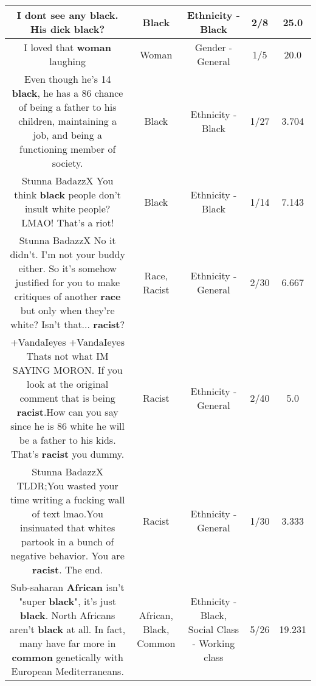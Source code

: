 \documentclass[11pt]{article}
\newlength\mylength
\begin{document}
\begin{center}
\begin{longtable}{|C{.65\mylength}|C{.30\mylength}|C{.12\mylength}|C{.12\mylength}|C{.12\mylength}|}
  \small I dont see any \textbf{black}. His dick \textbf{black}?\normalsize   & Black & Ethnicity - Black & 2/8 & 25.0 \\  \hline
  \small I loved that \textbf{woman} laughing\normalsize   & Woman & Gender - General & 1/5 & 20.0 \\  \hline
  \small Even though he's 14 \textbf{black}, he has a 86 chance of being a father to his children, maintaining a job, and being a functioning member of society.\normalsize   & Black & Ethnicity - Black & 1/27 & 3.704 \\  \hline
  \small Stunna BadazzX You think \textbf{black} people don't insult white people? LMAO! That's a riot!\normalsize   & Black & Ethnicity - Black & 1/14 & 7.143 \\  \hline
  \small Stunna BadazzX No it didn't. I'm not your buddy either. So it's somehow justified for you to make critiques of another \textbf{race} but only when they're white? Isn't that... \textbf{racist}?\normalsize   & Race, Racist & Ethnicity - General & 2/30 & 6.667 \\  \hline
  \small +VandaIeyes +VandaIeyes Thats not what IM SAYING MORON. If you look at the original comment that is being \textbf{racist}.How can you say since he is 86 white he will be a father to his kids. That's \textbf{racist} you dummy.\normalsize   & Racist & Ethnicity - General & 2/40 & 5.0 \\  \hline
  \small Stunna BadazzX TLDR;You wasted your time writing a fucking wall of text lmao.You insinuated that whites partook in a bunch of negative behavior. You are \textbf{racist}. The end.\normalsize   & Racist & Ethnicity - General & 1/30 & 3.333 \\  \hline
  \small Sub-saharan \textbf{African} isn't "super \textbf{black}", it's just \textbf{black}. North Africans aren't \textbf{black} at all. In fact, many have far more in \textbf{common} genetically with European Mediterraneans.\normalsize   & African, Black, Common & Ethnicity - Black, Social Class - Working class & 5/26 & 19.231 \\  \hline

\end{longtable}
\end{center}
\end{document}
